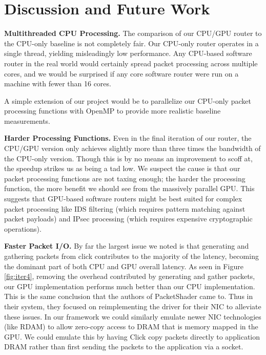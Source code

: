 \section{Discussion and Future Work}
\label{sec:disc}

\noindent \textbf{Multithreaded CPU Processing.} The comparison of our CPU/GPU
router to the CPU-only baseline is not completely fair. Our CPU-only router
operates in a single thread, yielding misleadingly low performance. Any
CPU-based software router in the real world would certainly spread packet
processing across multiple cores, and we would be surprised if any core
software router were run on a machine with fewer than 16 cores.

A simple extension of our project would be to parallelize our CPU-only packet
processing functions with OpenMP to provide more realistic baseline
measurements.

\medskip \noindent \textbf{Harder Processing Functions.} Even in the final
iteration of our router, the CPU/GPU version only achieves slightly more than
three times the bandwidth of the CPU-only version. Though this is by no means
an improvement to scoff at, the speedup strikes us as being a tad low. We
suspect the cause is that our packet processing functions are not taxing
enough; the harder the processing function, the more benefit we should see from
the massively parallel GPU. This suggests that GPU-based software routers might
be best suited for complex packet processing like IDS filtering (which requires
pattern matching against packet payloads) and IPsec processing (which requires
expensive cryptographic operations).

\medskip \noindent \textbf{Faster Packet I/O.} By far the largest issue we noted
is that generating and gathering packets from click contributes to the majority
of the latency, becoming the dominant part of both CPU and GPU overall
latency. As seen in Figure \ref{fig:iter4}, removing the overhead contributed by
generating and gather packets, our GPU implementation performs much better than
our CPU implementation. This is the same conclusion that the authors of
PacketShader \cite{Han} came to. Thus in their system, they focused on
reimplementing the driver for their NIC to alleviate these issues. In our
framework we could similarly emulate newer NIC technologies (like RDAM) to allow
zero-copy access to DRAM that is memory mapped in the GPU. We could emulate this
by having Click copy packets directly to application DRAM rather than first
sending the packets to the application via a socket.

